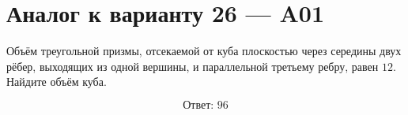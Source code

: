 \documentclass[12pt,a4paper]{article}
\begin{document}
\section*{Аналог к варианту 26 — A01}

Объём треугольной призмы, отсекаемой от куба плоскостью через середины двух рёбер, выходящих из одной вершины, и параллельной третьему ребру, равен \(12\). Найдите объём куба.

\begin{center}
\end{center}

\[
\boxed{\text{Ответ: }96}
\]
\end{document}
